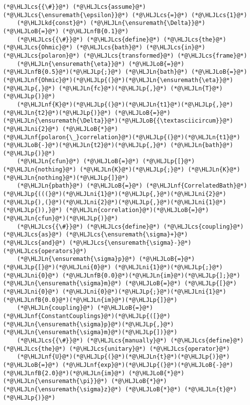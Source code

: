 \documentclass[12pt,a4paper]{article}
\newcommand{\HLJLkd}[1]{\textcolor[RGB]{214,102,97}{\textit{#1}}}
\newcommand{\HLJLn}[1]{#1}
\newcommand{\HLJLnf}[1]{\textcolor[RGB]{66,102,213}{#1}}
\newcommand{\HLJLnfB}[1]{\textcolor[RGB]{59,151,46}{#1}}
\newcommand{\HLJLni}[1]{\textcolor[RGB]{59,151,46}{#1}}
\newcommand{\HLJLoB}[1]{\textcolor[RGB]{102,102,102}{\textbf{#1}}}
\newcommand{\HLJLp}[1]{#1}
\newcommand{\HLJLcs}[1]{\textcolor[RGB]{153,153,119}{\textit{#1}}}
\begin{document}
\begin{lstlisting}
(*@\HLJLcs{{\#}}@*) (*@\HLJLcs{assume}@*) (*@\HLJLcs{\ensuremath{\epsilon}}@*) (*@\HLJLcs{=}@*) (*@\HLJLcs{1}@*)
    (*@\HLJLkd{const}@*) (*@\HLJLn{\ensuremath{\Delta}}@*) (*@\HLJLoB{=}@*) (*@\HLJLnfB{0.1}@*) 
    (*@\HLJLcs{{\#}}@*) (*@\HLJLcs{define}@*) (*@\HLJLcs{the}@*) (*@\HLJLcs{Ohmic}@*) (*@\HLJLcs{bath}@*) (*@\HLJLcs{in}@*) (*@\HLJLcs{polaron}@*) (*@\HLJLcs{transformed}@*) (*@\HLJLcs{frame}@*)
    (*@\HLJLn{\ensuremath{\eta}}@*) (*@\HLJLoB{=}@*) (*@\HLJLnfB{0.5}@*)(*@\HLJLp{;}@*) (*@\HLJLn{bath}@*) (*@\HLJLoB{=}@*) (*@\HLJLnf{Ohmic}@*)(*@\HLJLp{(}@*)(*@\HLJLn{\ensuremath{\eta}}@*)(*@\HLJLp{,}@*) (*@\HLJLn{fc}@*)(*@\HLJLp{,}@*) (*@\HLJLn{T}@*)(*@\HLJLp{)}@*)
    (*@\HLJLnf{K}@*)(*@\HLJLp{(}@*)(*@\HLJLn{t1}@*)(*@\HLJLp{,}@*) (*@\HLJLn{t2}@*)(*@\HLJLp{)}@*) (*@\HLJLoB{=}@*) (*@\HLJLn{\ensuremath{\Delta}}@*)(*@\HLJLoB{{\textasciicircum}}@*)(*@\HLJLni{2}@*) (*@\HLJLoB{*}@*) (*@\HLJLnf{polaron{\_}correlation}@*)(*@\HLJLp{(}@*)(*@\HLJLn{t1}@*)(*@\HLJLoB{-}@*)(*@\HLJLn{t2}@*)(*@\HLJLp{,}@*) (*@\HLJLn{bath}@*)(*@\HLJLp{)}@*)
    (*@\HLJLn{cfun}@*) (*@\HLJLoB{=}@*) (*@\HLJLp{[}@*)(*@\HLJLn{nothing}@*) (*@\HLJLn{K}@*)(*@\HLJLp{;}@*) (*@\HLJLn{K}@*) (*@\HLJLn{nothing}@*)(*@\HLJLp{]}@*)
    (*@\HLJLn{pbath}@*) (*@\HLJLoB{=}@*) (*@\HLJLnf{CorrelatedBath}@*)(*@\HLJLp{(((}@*)(*@\HLJLni{1}@*)(*@\HLJLp{,}@*)(*@\HLJLni{2}@*)(*@\HLJLp{),(}@*)(*@\HLJLni{2}@*)(*@\HLJLp{,}@*)(*@\HLJLni{1}@*)(*@\HLJLp{)),}@*) (*@\HLJLn{correlation}@*)(*@\HLJLoB{=}@*)(*@\HLJLn{cfun}@*)(*@\HLJLp{)}@*)
    (*@\HLJLcs{{\#}}@*) (*@\HLJLcs{define}@*) (*@\HLJLcs{coupling}@*) (*@\HLJLcs{as}@*) (*@\HLJLcs{\ensuremath{\sigma}+}@*) (*@\HLJLcs{and}@*) (*@\HLJLcs{\ensuremath{\sigma}-}@*) (*@\HLJLcs{operators}@*)
    (*@\HLJLn{\ensuremath{\sigma}p}@*) (*@\HLJLoB{=}@*) (*@\HLJLp{[}@*)(*@\HLJLni{0}@*) (*@\HLJLni{1}@*)(*@\HLJLp{;}@*)(*@\HLJLni{0}@*) (*@\HLJLnfB{0.0}@*)(*@\HLJLn{im}@*)(*@\HLJLp{];}@*) (*@\HLJLn{\ensuremath{\sigma}m}@*) (*@\HLJLoB{=}@*) (*@\HLJLp{[}@*)(*@\HLJLni{0}@*) (*@\HLJLni{0}@*)(*@\HLJLp{;}@*)(*@\HLJLni{1}@*) (*@\HLJLnfB{0.0}@*)(*@\HLJLn{im}@*)(*@\HLJLp{]}@*)
    (*@\HLJLn{coupling}@*) (*@\HLJLoB{=}@*) (*@\HLJLnf{ConstantCouplings}@*)(*@\HLJLp{([}@*)(*@\HLJLn{\ensuremath{\sigma}p}@*)(*@\HLJLp{,}@*) (*@\HLJLn{\ensuremath{\sigma}m}@*)(*@\HLJLp{])}@*)
    (*@\HLJLcs{{\#}}@*) (*@\HLJLcs{manually}@*) (*@\HLJLcs{define}@*) (*@\HLJLcs{the}@*) (*@\HLJLcs{unitary}@*) (*@\HLJLcs{operator}@*)
    (*@\HLJLnf{U}@*)(*@\HLJLp{(}@*)(*@\HLJLn{t}@*)(*@\HLJLp{)}@*) (*@\HLJLoB{=}@*) (*@\HLJLnf{exp}@*)(*@\HLJLp{(}@*)(*@\HLJLoB{-}@*)(*@\HLJLnfB{2.0}@*)(*@\HLJLn{im}@*) (*@\HLJLoB{*}@*) (*@\HLJLn{\ensuremath{\pi}}@*) (*@\HLJLoB{*}@*) (*@\HLJLn{\ensuremath{\sigma}z}@*) (*@\HLJLoB{*}@*) (*@\HLJLn{t}@*)(*@\HLJLp{)}@*)

\end{lstlisting}
\end{document}
